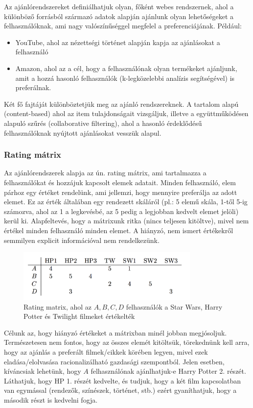 \documentclass[a4paper,12pt]{article}
\begin{document}
Az ajánlórendszereket definiálhatjuk olyan, főként webes rendszernek, ahol a különböző forrásból származó adatok alapján ajánlunk olyan lehetőségeket a felhasználóknak, ami nagy valószínűséggel megfelel a preferenciájának. Például:
\begin{itemize}
\item YouTube, ahol az nézettségi történet alapján kapja az ajánlásokat a felhasználó
\item Amazon, ahol az a cél, hogy a felhasználónak olyan termékeket ajánljunk, amit a hozzá hasonló felhasználók (k-legközelebbi analízis segítségével) is preferálnak. \cite{knearest}
\end{itemize}
Két fő fajtáját különböztetjük meg az ajánló rendszereknek. A tartalom alapú (content-based) ahol az item tulajdonságait vizsgáljuk, illetve a együttműködésen alapuló szűrés (collaborative filtering), ahol a hasonló érdeklődésű felhasználóknak nyújtott ajánlásokat vesszük alapul. \newline


\subsubsection{Rating mátrix}

Az ajánlórendszerek alapja az ún. rating mátrix, ami tartalmazza a felhasználókat és hozzájuk kapcsolt elemek adatait. Minden felhasználó, elem párhoz egy értéket rendelünk, ami jellemzi, hogy mennyire preferálja az adott elemet. Ez az érték általában egy rendezett skáláról (pl.: 5 elemű skála, 1-től 5-ig számozva, ahol az 1 a legkevésbé, az 5 pedig a legjobban kedvelt elemet jelöli) kerül ki. Alapfeltevés, hogy a mátrixunk ritka (nincs teljesen kitöltve), mivel nem értékel minden felhasználó minden elemet. A hiányzó, nem ismert értékekről semmilyen explicit információval nem rendelkezünk.

\begin{figure}[ht!]
\centering
\includegraphics[width=90mm]{img/um.png}
\caption{Rating matrix, ahol az $A,B, C, D$ felhasználók a Star Wars, Harry Potter és Twilight filmeket értékelték~\cite{UlmannMatrix} \label{um}}
\end{figure}

Célunk az, hogy hiányzó értékeket a mátrixban minél jobban megjósoljuk. Természetesen nem fontos, hogy az összes elemét kitöltsük, törekednünk kell arra, hogy az ajánlás a preferált filmek/cikkek körében legyen, mivel ezek eladása/elolvasása racionalizálható gazdasági szempontból. Jelen esetben, kíváncsiak lehetünk, hogy $A$ felhasználónak ajánlhatjuk-e Harry Potter 2. részét. Láthatjuk, hogy HP 1. részét kedvelte, és tudjuk, hogy a két film kapcsolatban van egymással (rendezők, színészek, történet, stb.) ezért gyaníthatjuk, hogy a második részt is kedvelni fogja.
\end{document}

